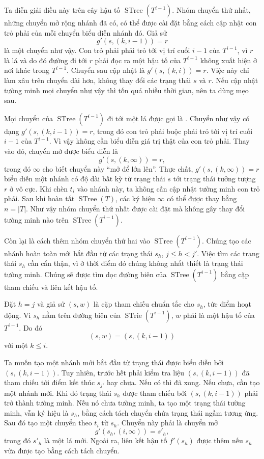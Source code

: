 \documentclass[11pt]{article}
\newcommand{\STrie}{\operatorname{STrie}}
\newcommand{\STree}{\operatorname{STree}}
\begin{document}
Ta diễn giải điều này trên cây hậu tố $\STree(T^{i-1})$. Nhóm chuyển thứ nhất,
những chuyển mở rộng nhánh đã có, có thể được cài đặt bằng cách cập nhật con
trỏ phải của mỗi chuyển biểu diễn nhánh đó. Giả sử
\[
  g'(s,(k,i-1))=r
\]
là một chuyển như vậy. Con trỏ phải phải trỏ tới vị trí cuối $i-1$ của
$T^{i-1}$, vì $r$ là lá và do đó đường đi tới $r$ phải đọc ra một hậu tố của
$T^{i-1}$ không xuất hiện ở nơi khác trong $T^{i-1}$. Chuyển sau cập nhật là
$g'(s,(k,i))=r$. Việc này chỉ làm xâu trên chuyển dài hơn, không thay đổi các
trạng thái $s$ và $r$. Nếu cập nhật tường minh mọi chuyển như vậy thì tốn quá
nhiều thời gian, nên ta dùng mẹo sau.

Mọi chuyển của $\STree(T^{i-1})$ đi tới một lá được gọi là .
Chuyển như vậy có dạng $g'(s,(k,i-1))=r$, trong đó con trỏ phải buộc phải trỏ
tới vị trí cuối $i-1$ của $T^{i-1}$. Vì vậy không cần biểu diễn giá trị thật
của con trỏ phải. Thay vào đó, chuyển mở được biểu diễn là
\[
  g'(s,(k,\infty))=r,
\]
trong đó $\infty$ cho biết chuyển này ``mở để lớn lên''. Thực chất,
$g'(s,(k,\infty))=r$ biểu diễn một nhánh có độ dài bất kỳ từ trạng thái $s$
tới trạng thái tưởng tượng $r$ ở vô cực. Khi chèn $t_i$ vào nhánh này, ta
không cần cập nhật tường minh con trỏ phải. Sau khi hoàn tất $\STree(T)$, các
ký hiệu $\infty$ có thể được thay bằng $n=|T|$. Như vậy nhóm chuyển thứ nhất
được cài đặt mà không gây thay đổi tường minh nào trên $\STree(T^{i-1})$.

Còn lại là cách thêm nhóm chuyển thứ hai vào $\STree(T^{i-1})$. Chúng tạo các
nhánh hoàn toàn mới bắt đầu từ các trạng thái $s_h$, $j\le h<j'$. Việc tìm
các trạng thái $s_h$ cần cẩn thận, vì ở thời điểm đó chúng không nhất thiết là
trạng thái tường minh. Chúng sẽ được tìm dọc đường biên của $\STree(T^{i-1})$
bằng cặp tham chiếu và liên kết hậu tố.

Đặt $h=j$ và giả sử $(s,w)$ là cặp tham chiếu chuẩn tắc cho $s_h$, tức điểm
hoạt động. Vì $s_h$ nằm trên đường biên của $\STrie(T^{i-1})$, $w$ phải là
một hậu tố của $T^{i-1}$. Do đó
\[
  (s,w)=(s,(k,i-1))
\]
với một $k\le i$.

Ta muốn tạo một nhánh mới bắt đầu từ trạng thái được biểu diễn bởi
$(s,(k,i-1))$. Tuy nhiên, trước hết phải kiểm tra liệu $(s,(k,i-1))$ đã tham
chiếu tới điểm kết thúc $s_{j'}$ hay chưa. Nếu có thì đã xong. Nếu chưa, cần
tạo một nhánh mới. Khi đó trạng thái $s_h$ được tham chiếu bởi $(s,(k,i-1))$
phải trở thành tường minh. Nếu nó chưa tường minh, ta tạo một trạng thái
tường minh, vẫn ký hiệu là $s_h$, bằng cách tách chuyển chứa trạng thái ngầm
tương ứng. Sau đó tạo một chuyển theo $t_i$ từ $s_h$. Chuyển này phải là
chuyển mở
\[
  g'(s_h,(i,\infty))=s'_h,
\]
trong đó $s'_h$ là một lá mới. Ngoài ra, liên kết hậu tố $f'(s_h)$ được thêm
nếu $s_h$ vừa được tạo bằng cách tách chuyển.
\end{document}
